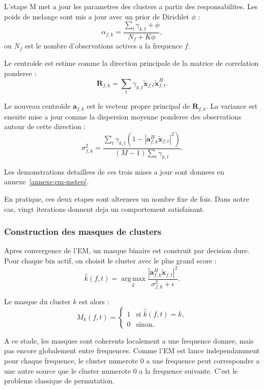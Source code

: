 \documentclass[11pt,a4paper]{article}
\newcommand{\argmax}{\operatorname*{arg\,max}}
\begin{document}
L'etape M met a jour les parametres des clusters a partir des responsabilites.
Les poids de melange sont mis a jour avec un prior de Dirichlet $\phi$ :
\[
  \alpha_{f,k}
    =
    \frac{\sum_t \gamma_{k,t}+\phi}
         {N_f+K\phi},
\]
ou $N_f$ est le nombre d'observations actives a la frequence $f$.

Le centroïde est estime comme la direction principale de la matrice de
correlation ponderee :
\[
  \mathbf{R}_{f,k}
    =
    \sum_t
    \gamma_{k,t}
    \tilde{\mathbf{x}}_{f,t}
    \tilde{\mathbf{x}}_{f,t}^{H}.
\]

Le nouveau centroïde $\mathbf{a}_{f,k}$ est le vecteur propre principal de
$\mathbf{R}_{f,k}$. La variance est ensuite mise a jour comme la dispersion
moyenne ponderee des observations autour de cette direction :
\[
  \sigma_{f,k}^2
    =
    \frac{
      \sum_t \gamma_{k,t}
      \left(
        1-\left|\mathbf{a}_{f,k}^{H}\tilde{\mathbf{x}}_{f,t}\right|^2
      \right)
    }
    {
      (M-1)\sum_t \gamma_{k,t}
    }.
\]

Les demonstrations detaillees de ces trois mises a jour sont donnees en
annexe~\ref{annexe:em-mstep}.

En pratique, ces deux etapes sont alternees un nombre fixe de fois. Dans notre
cas, vingt iterations donnent deja un comportement satisfaisant.

\subsubsection{Construction des masques de clusters}

Apres convergence de l'EM, un masque binaire est construit par decision dure.
Pour chaque bin actif, on choisit le cluster avec le plus grand score :
\[
  \hat{k}(f,t)
    =
    \argmax_k
    \frac{
      \left|
        \mathbf{a}_{f,k}^{H}
        \tilde{\mathbf{x}}_{f,t}
      \right|^2
    }
    {\sigma^2_{f,k}+\epsilon}.
\]

Le masque du cluster $k$ est alors :
\[
  M_k(f,t)
    =
    \begin{cases}
      1 & \text{si } \hat{k}(f,t)=k,\\
      0 & \text{sinon.}
    \end{cases}
\]

A ce stade, les masques sont coherents localement a une frequence donnee, mais
pas encore globalement entre frequences. Comme l'EM est lance independamment
pour chaque frequence, le cluster numerote $0$ a une frequence peut correspondre
a une autre source que le cluster numerote $0$ a la frequence suivante. C'est le
probleme classique de permutation.
\end{document}
